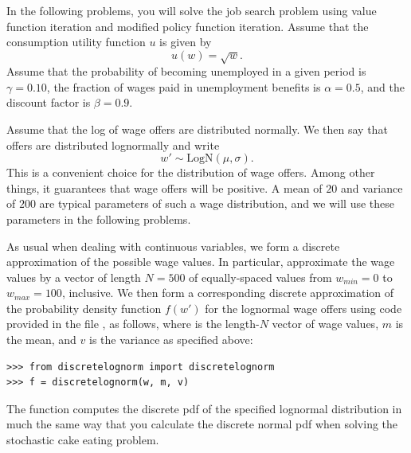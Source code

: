 In the following problems, you will solve the job search problem using value function iteration and modified policy
function iteration. Assume that the consumption utility function $u$ is given by
\[
u(w) = \sqrt{w}.
\]
Assume that the probability of becoming unemployed in a given period is $\gamma = 0.10$, the fraction of wages paid
in unemployment benefits is $\alpha = 0.5$, and the discount factor is $\beta = 0.9$.

Assume that the log of wage offers are distributed normally.  We then say that offers are distributed
lognormally and write
\[
w'\sim \text{LogN}(\mu,\sigma).
\]
This is a convenient choice for the distribution of
wage offers.  Among other things, it guarantees that wage offers will be positive.
A mean of $20$ and variance of $200$ are typical parameters of such a wage distribution,
and we will use these parameters in the following problems.

As usual when dealing with continuous variables, we form a discrete approximation of
the possible wage values. In particular, approximate the wage values by a vector of
length $N = 500$ of equally-spaced values from $w_{min} = 0$ to $w_{max} = 100$, inclusive.
We then form a corresponding discrete approximation of the probability density function
$f(w')$ for the lognormal wage offers using code provided in the file ,
as follows, where  is the length-$N$ vector of wage values, $m$ is the mean, and $v$ is
the variance as specified above:
\begin{lstlisting}
>>> from discretelognorm import discretelognorm
>>> f = discretelognorm(w, m, v)
\end{lstlisting}
The function  computes the discrete pdf of the specified lognormal distribution in much
the same way that you calculate the discrete normal pdf when solving the stochastic cake eating problem.


